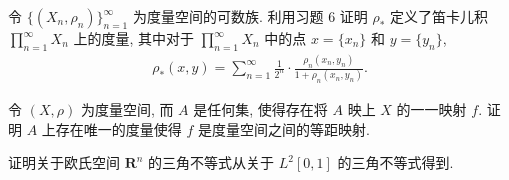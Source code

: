 \documentclass[../../main.tex]{subfiles}
\begin{document}
\begin{exercise}\label{exercise:ch09-10}
令 $\{(X_{n},\rho_{n})\}_{n=1}^{\infty}$ 为度量空间的可数族. 利用习题 6 证明 $\rho_{*}$ 定义了笛卡儿积 $\prod_{n=1}^{\infty}X_{n}$ 上的度量, 其中对于 $\prod_{n=1}^{\infty}X_{n}$ 中的点 $x=\{x_{n}\}$ 和 $y=\{y_{n}\}$,
\begin{align*}
\rho_{*}(x,y)=\sum_{n=1}^{\infty}\frac{1}{2^{n}}\cdot\frac{\rho_{n}(x_{n},y_{n})}{1+\rho_{n}(x_{n},y_{n})}.
\end{align*}
\end{exercise}

\begin{exercise}\label{exercise:ch09-11}
令 $(X,\rho)$ 为度量空间, 而 $A$ 是任何集, 使得存在将 $A$ 映上 $X$ 的一一映射 $f$. 证明 $A$ 上存在唯一的度量使得 $f$ 是度量空间之间的等距映射.
\end{exercise}

\begin{exercise}\label{exercise:ch09-12}
证明关于欧氏空间 $\mathbf{R}^{n}$ 的三角不等式从关于 $L^{2}[0,1]$ 的三角不等式得到.
\end{exercise}
\end{document}
